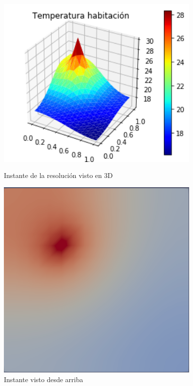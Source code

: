 \documentclass[12pt,paperletter]{article}
\begin{document}
\begin{figure}[H]
    \centering
    \begin{minipage}{0.45\textwidth}
        \centering
        \includegraphics[width=0.9\textwidth]{ejemplo1.png} %
        \caption{Instante de la resolución visto en 3D}
    \end{minipage}\hfill
    \begin{minipage}{0.45\textwidth}
        \centering
        \includegraphics[width=0.9\textwidth]{ejemplo2.PNG} %
        \caption{Instante visto desde arriba}
    \end{minipage}
\end{figure}
\end{document}
